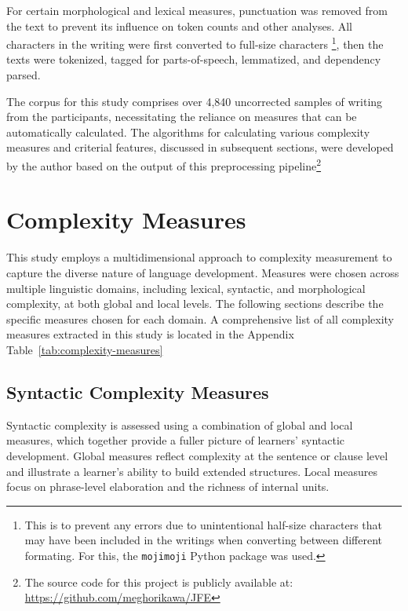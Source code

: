 For certain morphological and lexical measures, punctuation was removed from the text to prevent its influence on
token counts and other analyses. All characters in the writing were first converted to full-size characters \footnote{This is to prevent any errors due to unintentional half-size characters that may have been included in the writings when converting between different formating. For this, the \texttt{mojimoji} Python package was used.}, then
the texts were tokenized, tagged for parts-of-speech,
lemmatized, and dependency parsed.

The corpus for this study comprises over 4,840 uncorrected samples of writing from the participants, necessitating
the reliance on measures that can be automatically calculated.
 The algorithms for calculating various complexity measures and criterial features, discussed in subsequent
sections, were developed by the author based on the output of this preprocessing pipeline\footnote{The source code for
this project is publicly available at: \href{https://github.com/meghorikawa/JFE}{https://github.com/meghorikawa/JFE}}

\section{Complexity Measures}
This study employs a multidimensional approach to complexity
measurement to capture the diverse nature of language development. Measures were chosen across multiple linguistic
domains, including lexical, syntactic, and morphological
complexity, at both global and local levels. The following sections describe the specific measures chosen for each
domain. A comprehensive list of all complexity measures extracted in this study is located in the Appendix
Table~\ref{tab:complexity-measures}

\subsection{Syntactic Complexity Measures}
Syntactic complexity is assessed using a combination of global and local measures, which together provide a fuller
picture of learners' syntactic development. Global measures reflect complexity at the sentence or clause level
and illustrate a learner's ability to build extended structures. Local measures focus on phrase-level elaboration
and the richness of internal units.

